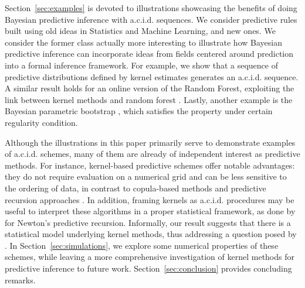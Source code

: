 \documentclass{article}
\theoremstyle{definition}
\renewcommand{\&}{and}
\begin{document}
  
Section~\ref{sec:examples} is devoted to illustrations showcasing the benefits of doing Bayesian predictive inference with a.c.i.d. sequences. %
We consider predictive rules built using old ideas in Statistics and Machine Learning, and new ones. 
We consider the former class actually more interesting to illustrate how Bayesian predictive inference can incorporate ideas from fields centered around prediction into a formal inference framework. For example, we show that a sequence of predictive distributions defined by kernel estimates generates an a.c.i.d. sequence. %
A similar result holds for an online version of the Random Forest, exploiting the link between kernel methods and random forest \citep{breiman2000some}.
Lastly, another example is the Bayesian parametric bootstrap \citep{holmes2023statistical,fong2024asymptotics}, which satisfies the property under certain regularity condition. %



Although the illustrations in this paper primarily serve to demonstrate examples of a.c.i.d. schemes, many of them are already of independent interest as predictive methods. For instance, kernel-based predictive schemes offer notable advantages: they do not require evaluation on a numerical grid and can be less sensitive to the ordering of data, in contrast to copula-based methods \citep{hahn18,fong2021martingale} and predictive recursion approaches \citep{new98,fortini2020quasi}. In addition, framing kernels as a.c.i.d. procedures may be useful to interpret these algorithms in a proper statistical framework, as done by \cite{fortini2020quasi} for Newton's predictive recursion. Informally, our result suggests that there is a statistical model underlying kernel methods, thus addressing a question posed by \cite{west1991kernel}. In Section~\ref{sec:simulations}, we explore some numerical properties of these schemes, while leaving a more comprehensive investigation of kernel methods for predictive inference to future work. Section~\ref{sec:conclusion} provides concluding remarks.
 
\end{document}
